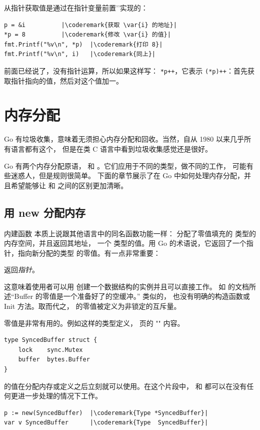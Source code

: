 从指针获取值是通过在指针变量前置'\type{*}'实现的：
\begin{lstlisting}[caption=获取指针指向的值,label=src:deref]
p = &i			|\coderemark{获取 \var{i} 的地址}|
*p = 8			|\coderemark{修改 \var{i} 的值}|
fmt.Printf("%v\n", *p)  |\coderemark{打印 8}|
fmt.Printf("%v\n", i)	|\coderemark{同上}|
\end{lstlisting}

前面已经说了，没有指针运算，所以如果这样写：
\lstinline{*p++}，它表示 \lstinline{(*p)++}：首先获取指针指向的值，然后对这个值加一。


\section{内存分配}
Go 有垃圾收集，意味着无须担心内存分配和回收。当然，自从 1980 以来几乎所有语言都有这个，
但是在类 C 语言中看到垃圾收集感觉还是很好。

Go 有两个内存分配原语， 和 。它们应用于不同的类型，做不同的工作，
可能有些迷惑人，但是规则很简单。
下面的章节展示了在 Go 中如何处理内存分配，并且希望能够让
 和  之间的区别更加清晰。

\subsection{用 new 分配内存}
\label{sec:allocation with new}
内建函数  本质上说跟其他语言中的同名函数功能一样：
 分配了零值填充的  类型的内存空间，并且返回其地址，
一个  类型的值。用 Go 的术语说，它返回了一个指针，指向新分配的类型 
的零值。有一点非常重要：
\begin{lbar}
 返回\emph{指针}。
\end{lbar}

这意味着使用者可以用  创建一个数据结构的实例并且可以直接工作。
如  的文档所述“Buffer 的零值是一个准备好了的空缓冲。”
类似的， 也没有明确的构造函数或 Init 方法。取而代之，
 的零值被定义为非锁定的互斥量。

零值是非常有用的。例如这样的类型定义，\pageref{sec:defining your own}
页的 "" 内容。
\begin{lstlisting}
type SyncedBuffer struct {
    lock    sync.Mutex
    buffer  bytes.Buffer
}
\end{lstlisting}
 的值在分配内存或定义之后立刻就可以使用。在这个片段中，
 和  都可以在没有任何更进一步处理的情况下工作。
\begin{lstlisting}
p := new(SyncedBuffer)  |\coderemark{Type *SyncedBuffer}|
var v SyncedBuffer      |\coderemark{Type  SyncedBuffer}|
\end{lstlisting}

